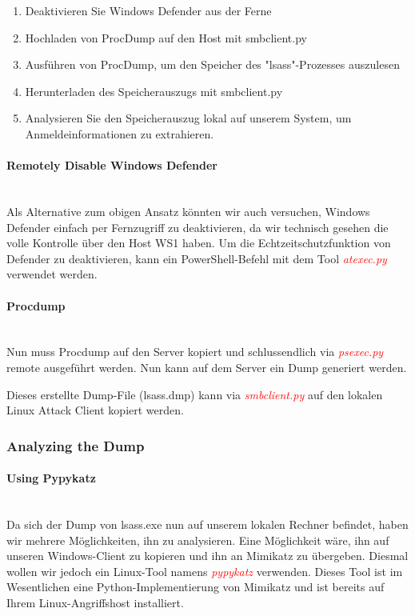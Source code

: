 \begin{enumerate}
    \item Deaktivieren Sie Windows Defender aus der Ferne
    \item Hochladen von ProcDump auf den Host mit smbclient.py
    \item Ausführen von ProcDump, um den Speicher des "lsass"-Prozesses auszulesen
    \item Herunterladen des Speicherauszugs mit smbclient.py
    \item Analysieren Sie den Speicherauszug lokal auf unserem System, um Anmeldeinformationen zu extrahieren.
\end{enumerate}

\paragraph{Remotely Disable Windows Defender}\mbox{} \\
Als Alternative zum obigen Ansatz könnten wir auch versuchen, Windows Defender einfach per Fernzugriff zu deaktivieren, da wir technisch gesehen die volle Kontrolle über den Host WS1 haben.
Um die Echtzeitschutzfunktion von Defender zu deaktivieren, kann ein PowerShell-Befehl mit dem Tool \textcolor{red}{\textit{atexec.py}} verwendet werden.

\paragraph{Procdump}\mbox{} \\
Nun muss Procdump auf den Server kopiert und schlussendlich via \textcolor{red}{\textit{psexec.py}} remote ausgeführt werden.
Nun kann auf dem Server ein Dump generiert werden.

Dieses erstellte Dump-File (lsass.dmp) kann via \textcolor{red}{\textit{smbclient.py}} auf den lokalen Linux Attack Client kopiert werden.

\subsubsection{Analyzing the Dump}

\paragraph{Using Pypykatz}\mbox{} \\
Da sich der Dump von lsass.exe nun auf unserem lokalen Rechner befindet, haben wir mehrere Möglichkeiten, ihn zu analysieren. Eine Möglichkeit wäre, ihn auf unseren Windows-Client zu kopieren und ihn an Mimikatz zu übergeben. Diesmal wollen wir jedoch ein Linux-Tool namens \textcolor{red}{\textit{pypykatz}} verwenden.
Dieses Tool ist im Wesentlichen eine Python-Implementierung von Mimikatz und ist bereits auf Ihrem Linux-Angriffshost installiert.\\

